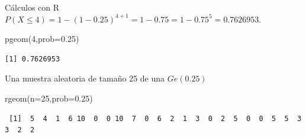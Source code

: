\documentclass[
  ignorenonframetext,
  aspectratio=169]{beamer}
\newenvironment{Shaded}{\begin{snugshade}}{\end{snugshade}}
\newcommand{\AttributeTok}[1]{\textcolor[rgb]{0.40,0.45,0.13}{#1}}
\newcommand{\DecValTok}[1]{\textcolor[rgb]{0.68,0.00,0.00}{#1}}
\newcommand{\FloatTok}[1]{\textcolor[rgb]{0.68,0.00,0.00}{#1}}
\newcommand{\FunctionTok}[1]{\textcolor[rgb]{0.28,0.35,0.67}{#1}}
\newcommand{\NormalTok}[1]{\textcolor[rgb]{0.00,0.23,0.31}{#1}}
\begin{document}
\begin{frame}[fragile]{Cálculos con R}
\protect\hypertarget{cuxe1lculos-con-r-1}{}
\(P(X\leq 4)=1-(1-0.25)^{4+1}=1-0.75=1-0.75^5=0.7626953.\)

\begin{Shaded}
\begin{Highlighting}[]
\FunctionTok{pgeom}\NormalTok{(}\DecValTok{4}\NormalTok{,}\AttributeTok{prob=}\FloatTok{0.25}\NormalTok{)}
\end{Highlighting}
\end{Shaded}

\begin{verbatim}
[1] 0.7626953
\end{verbatim}

Una muestra aleatoria de tamaño 25 de una \(Ge(0.25)\)

\begin{Shaded}
\begin{Highlighting}[]
\FunctionTok{rgeom}\NormalTok{(}\AttributeTok{n=}\DecValTok{25}\NormalTok{,}\AttributeTok{prob=}\FloatTok{0.25}\NormalTok{)}
\end{Highlighting}
\end{Shaded}

\begin{verbatim}
 [1]  5  4  1  6 10  0  0 10  7  0  6  2  1  3  0  2  5  0  0  5  5  3  3  2  2
\end{verbatim}
\end{frame}
\end{document}
